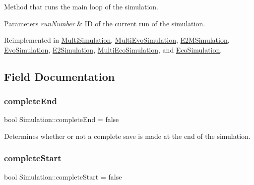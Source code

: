 Method that runs the main loop of the simulation. 


\begin{DoxyParams}{Parameters}
{\em run\+Number} & ID of the current run of the simulation. \\
\hline
\end{DoxyParams}


Reimplemented in \hyperlink{classMultiSimulation_a235347d04fd0c7e1a2e35d7a39e77583}{Multi\+Simulation}, \hyperlink{classMultiEvoSimulation_a89c9806ac998c06230cdd41cc6a532bf}{Multi\+Evo\+Simulation}, \hyperlink{classE2MSimulation_aeac4e92c10f89a5c953ace5b1327d20b}{E2\+M\+Simulation}, \hyperlink{classEvoSimulation_aa43aa351dec24c638e56995a67a4f0f5}{Evo\+Simulation}, \hyperlink{classE2Simulation_a28028881fd443d2445b562512cb2169c}{E2\+Simulation}, \hyperlink{classMultiEcoSimulation_ad490e089c083d06d80c62af9e1564ac3}{Multi\+Eco\+Simulation}, and \hyperlink{classEcoSimulation_a72ec5e7dffb4231b2cb363b632788622}{Eco\+Simulation}.



\subsection{Field Documentation}
\mbox{\label{classSimulation_a17bcf189d0f10fa47e4b2dc4b53d4939}} 
\subsubsection{\texorpdfstring{complete\+End}{completeEnd}}
{\footnotesize\ttfamily bool Simulation\+::complete\+End = false\hspace{0.3cm}{\ttfamily [protected]}}

Determines whether or not a complete save is made at the end of the simulation. \mbox{\label{classSimulation_a84cd73f44cff4fdbbb40fb98b49f8026}} 
\subsubsection{\texorpdfstring{complete\+Start}{completeStart}}
{\footnotesize\ttfamily bool Simulation\+::complete\+Start = false\hspace{0.3cm}{\ttfamily [protected]}}

